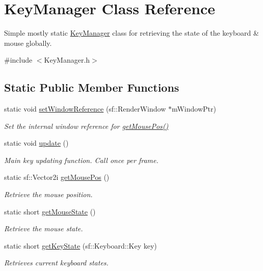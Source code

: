 \hypertarget{class_key_manager}{}\section{Key\+Manager Class Reference}
\label{class_key_manager}


Simple mostly static \mbox{\hyperlink{class_key_manager}{Key\+Manager}} class for retrieving the state of the keyboard \& mouse globally.  




{\ttfamily \#include $<$Key\+Manager.\+h$>$}

\subsection*{Static Public Member Functions}
\begin{DoxyCompactItemize}
\item 
static void \mbox{\hyperlink{class_key_manager_a48403a4f4e0619e4cb2de536c397647c}{set\+Window\+Reference}} (sf\+::\+Render\+Window $\ast$m\+Window\+Ptr)
\begin{DoxyCompactList}\small\item\em Set the internal window reference for \mbox{\hyperlink{class_key_manager_aae40b808bf243100e3da7e63fb8cebe5}{get\+Mouse\+Pos()}} \end{DoxyCompactList}\item 
\mbox{\label{class_key_manager_ab58d4b6587a7a83fe15c504be7424c2b}} 
static void \mbox{\hyperlink{class_key_manager_ab58d4b6587a7a83fe15c504be7424c2b}{update}} ()
\begin{DoxyCompactList}\small\item\em Main key updating function. Call once per frame. \end{DoxyCompactList}\item 
static sf\+::\+Vector2i \mbox{\hyperlink{class_key_manager_aae40b808bf243100e3da7e63fb8cebe5}{get\+Mouse\+Pos}} ()
\begin{DoxyCompactList}\small\item\em Retrieve the mouse position. \end{DoxyCompactList}\item 
static short \mbox{\hyperlink{class_key_manager_a4cdc82bbf58d5c140c3512563f090e59}{get\+Mouse\+State}} ()
\begin{DoxyCompactList}\small\item\em Retrieve the mouse state. \end{DoxyCompactList}\item 
static short \mbox{\hyperlink{class_key_manager_a6769c626a0ac7e919979e9128dfb6a88}{get\+Key\+State}} (sf\+::\+Keyboard\+::\+Key key)
\begin{DoxyCompactList}\small\item\em Retrieves current keyboard states. \end{DoxyCompactList}\end{DoxyCompactItemize}


